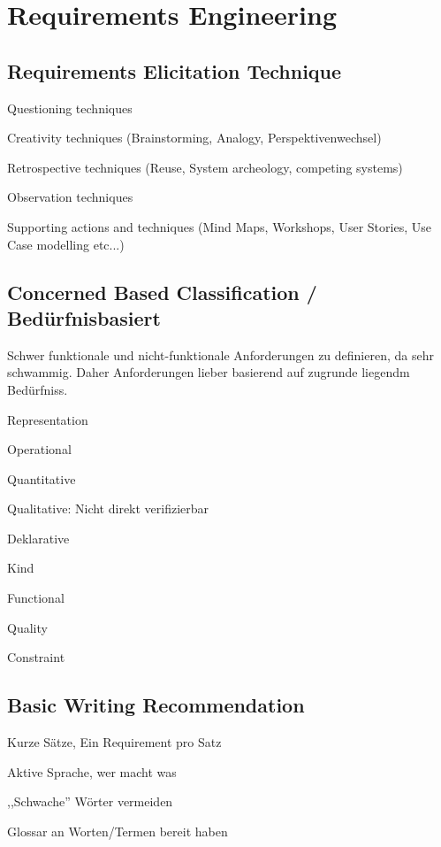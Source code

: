 \chapter{Requirements Engineering}


\section{Requirements Elicitation Technique}
\begin{compactitem}
    \item Questioning techniques
    \item Creativity techniques (Brainstorming, Analogy, Perspektivenwechsel)
    \item Retrospective techniques (Reuse, System archeology, competing systems)
    \item Observation techniques
    \item Supporting actions and techniques (Mind Maps, Workshops, User Stories,
    Use Case modelling etc...)
\end{compactitem}

\section{Concerned Based Classification / Bedürfnisbasiert}
Schwer funktionale und nicht-funktionale Anforderungen zu definieren, da sehr
schwammig. Daher Anforderungen lieber basierend auf zugrunde liegendm Bedürfniss.
\begin{compactitem}
    \item Representation
    \begin{compactitem}
        \item Operational
        \item Quantitative
        \item Qualitative: Nicht direkt verifizierbar
        \item Deklarative
    \end{compactitem}
    \item Kind
    \begin{compactitem}
        \item Functional
        \item Quality
        \item Constraint
    \end{compactitem}
\end{compactitem}


\section{Basic Writing Recommendation}
\begin{compactitem}
    \item Kurze Sätze, Ein Requirement pro Satz
    \item Aktive Sprache, wer macht was
    \item ,,Schwache'' Wörter vermeiden
    \item Glossar an Worten/Termen bereit haben
\end{compactitem}

